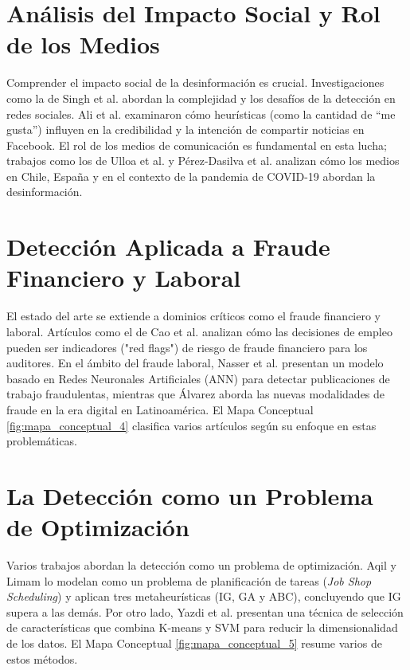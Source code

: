 \section{Análisis del Impacto Social y Rol de los Medios}
Comprender el impacto social de la desinformación es crucial. Investigaciones como la de Singh et al. \cite{singh2023comprehensive} abordan la complejidad y los desafíos de la detección en redes sociales. Ali et al. \cite{ali2021fake} examinaron cómo heurísticas (como la cantidad de ``me gusta'') influyen en la credibilidad y la intención de compartir noticias en Facebook. El rol de los medios de comunicación es fundamental en esta lucha; trabajos como los de Ulloa et al. \cite{carcamo2021fake} y Pérez-Dasilva et al. \cite{perez2020fake} analizan cómo los medios en Chile, España y en el contexto de la pandemia de COVID-19 abordan la desinformación.

\section{Detección Aplicada a Fraude Financiero y Laboral}
El estado del arte se extiende a dominios críticos como el fraude financiero y laboral. Artículos como el de Cao et al. \cite{cao2020corporate} analizan cómo las decisiones de empleo pueden ser indicadores ("red flags") de riesgo de fraude financiero para los auditores. En el ámbito del fraude laboral, Nasser et al. \cite{nasser2021online} presentan un modelo basado en Redes Neuronales Artificiales (ANN) para detectar publicaciones de trabajo fraudulentas, mientras que Álvarez \cite{alvarez2021fraude} aborda las nuevas modalidades de fraude en la era digital en Latinoamérica. El Mapa Conceptual \ref{fig:mapa_conceptual_4} clasifica varios artículos según su enfoque en estas problemáticas.

\section{La Detección como un Problema de Optimización}
Varios trabajos abordan la detección como un problema de optimización. Aqil y Limam \cite{aqil2021modeling} lo modelan como un problema de planificación de tareas (\textit{Job Shop Scheduling}) y aplican tres metaheurísticas (IG, GA y ABC), concluyendo que IG supera a las demás. Por otro lado, Yazdi et al. \cite{yazdi2020improving} presentan una técnica de selección de características que combina K-means y SVM para reducir la dimensionalidad de los datos. El Mapa Conceptual \ref{fig:mapa_conceptual_5} resume varios de estos métodos.

